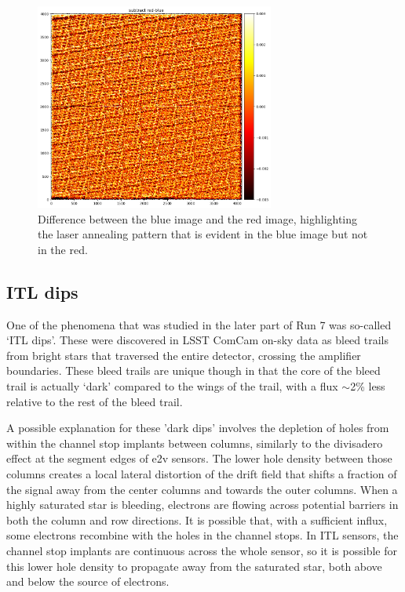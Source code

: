 \begin{figure}[ht]
\centering
\includegraphics[width=0.7\textwidth]{figures/subtract_red_blue.png}
\caption{Difference between the blue image and the red image, highlighting the laser annealing pattern that is evident in the blue image but not in the red.}
\label{fig:tree_ring_subtract_red_blue}
\end{figure}

\clearpage
\subsection{ITL dips}\label{itl-dips}

One of the phenomena that was studied in the later part of Run 7 was so-called 
`ITL dips'. These were discovered in LSST ComCam on-sky data as
bleed trails from bright stars that traversed the entire detector,
crossing the amplifier boundaries. These bleed trails are unique
though in that the core of the bleed trail is actually `dark'
compared to the wings of the trail, with a flux $\sim$2\% less relative to the rest of the
bleed trail. 

A possible explanation for these 'dark dips' involves the depletion of 
holes from within the channel stop implants between columns, similarly to the
divisadero effect at the segment edges of e2v sensors. The lower hole density 
between those columns creates a local lateral distortion of the drift field that shifts a fraction of the signal away from the center columns and towards the outer columns. 
When a highly saturated star is bleeding, electrons are flowing across potential barriers in both the column and row directions. It is possible that, with a sufficient influx, some electrons recombine with the holes in the channel stops. 
In ITL sensors, the channel stop implants are continuous across the whole sensor, so it is possible for this lower hole density to propagate away from the saturated star, both above and below the source of electrons.

